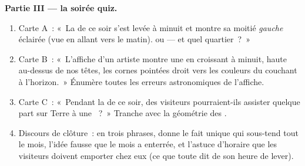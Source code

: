 \begin{problem}
\medskip\noindent\textbf{Partie III --- la soirée quiz.}
\begin{enumerate}[resume]
  \item Carte A~: «~La  de ce soir s'est levée à minuit et
        montre sa moitié \emph{gauche} éclairée (vue en allant vers
        le matin).  ou  --- et quel
        quartier~?~»
  \item Carte B~: «~L'affiche d'un artiste montre une  en
        croissant à minuit, haute au-dessus de nos têtes, les
        cornes pointées droit vers les couleurs du couchant à
        l'horizon.~» Énumère toutes les erreurs astronomiques de
        l'affiche.
  \item Carte C~: «~Pendant la  de ce soir, des
        visiteurs pourraient-ils assister quelque part sur Terre à
        une ~?~» Tranche avec la géométrie des
        .
  \item Discours de clôture~: en trois phrases, donne le fait
        unique qui sous-tend tout le mois, l'idée fausse que le
        mois a enterrée, et l'astuce d'horaire que les visiteurs
        doivent emporter chez eux (ce que toute  dit de son
        heure de lever).
\end{enumerate}
\end{problem}
